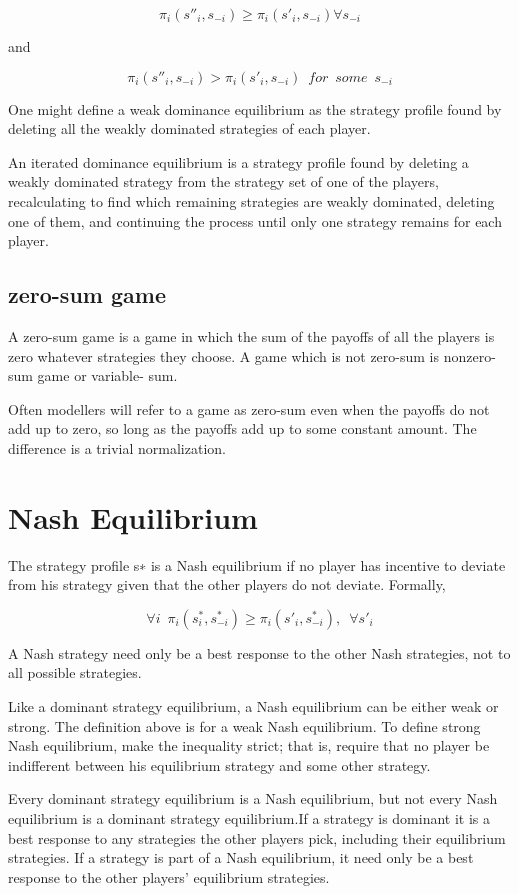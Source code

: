 \documentclass{article}
\begin{document}
\[
\pi_i(s''_i,s_{-i})\ge\pi_i(s'_i,s_{-i})\forall s_{-i}
\]

and

\[
\pi_i(s''_i,s_{-i})>\pi_i(s'_i,s_{-i})\enspace for\enspace some\enspace s_{-i}
\]

One might define a weak dominance equilibrium as the strategy profile found by
deleting all the weakly dominated strategies of each player.

An iterated dominance equilibrium is a strategy profile found by deleting a weakly
dominated strategy from the strategy set of one of the players, recalculating to find which
remaining strategies are weakly dominated, deleting one of them, and continuing the process
until only one strategy remains for each player.

\subsection{zero-sum game}

A zero-sum game is a game in which the sum of the payoffs of all the players is zero
whatever strategies they choose. A game which is not zero-sum is nonzero-sum game or
variable- sum.

Often modellers will refer
to a game as zero-sum even when the payoffs do not add up to zero, so long as the payoffs
add up to some constant amount. The difference is a trivial normalization.

\section{Nash Equilibrium}

The strategy profile s∗ is a Nash equilibrium if no player has incentive to deviate from
his strategy given that the other players do not deviate. Formally,

\[
\forall i\enspace \pi_i(s^*_i,s^*_{-i})\ge\pi_i(s'_i,s^*_{-i}),\enspace \forall s'_i
\]

A Nash strategy need only be a best response to the other Nash strategies,
not to all possible strategies.

Like a dominant strategy equilibrium, a Nash equilibrium can be either weak or strong.
The definition above is for a weak Nash equilibrium. To define strong Nash equilibrium,
make the inequality strict; that is, require that no player be indifferent between his equilibrium
strategy and some other strategy.

Every dominant strategy equilibrium is a Nash equilibrium, but not every Nash equilibrium
is a dominant strategy equilibrium.If a strategy is dominant it is a best response to
any strategies the other players pick, including their equilibrium strategies. If a strategy is
part of a Nash equilibrium, it need only be a best response to the other players’ equilibrium
strategies.
\end{document}
